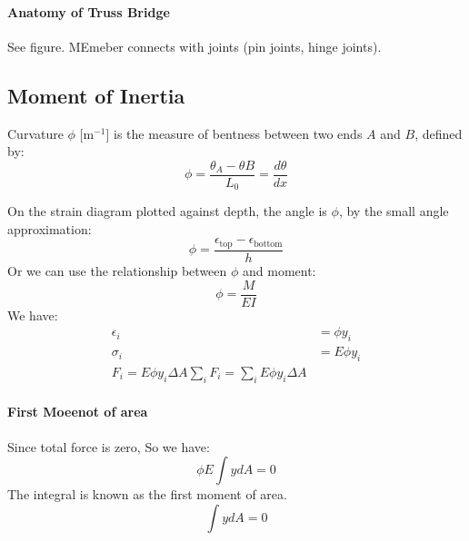\paragraph{Anatomy of Truss Bridge} See figure. MEmeber connects with joints (pin joints, hinge joints). 
\paragraph{}
\subsection{Moment of Inertia}
\begin{definition}[Curvature]
    Curvature $\phi$ [m$^{-1}$] is the measure of bentness between two ends $A$ and $B$, defined by:
    \begin{equation}
        \phi = \frac{\theta_A - \theta B}{L_0} = \frac{d \theta}{dx}
    \end{equation}
\end{definition}
    On the strain diagram plotted against depth, the angle is $\phi$, by the small angle approximation:
    \begin{equation}
        \phi = \frac{\epsilon_\text{top} - \epsilon_\text{bottom}}{h}
    \end{equation}
    Or we can use the relationship between $\phi$ and moment:
    \begin{equation}
        \phi =  \frac{M}{EI}
    \end{equation}
We have:
\begin{align*}
    \epsilon_i &= \phi y_i\\
    \sigma_i &= E\phi y_i\\
    F_i = E\phi y_i \Delta A
    \sum_i F_i = \sum_i E\phi y_i \Delta A
\end{align*}
\paragraph{First Moeenot of area} Since total force is zero, So we have:
\begin{equation}
    \phi E \int y dA = 0 
\end{equation}
The integral is known as the first moment of area. 
\begin{equation}
     \int y dA = 0 
\end{equation}
